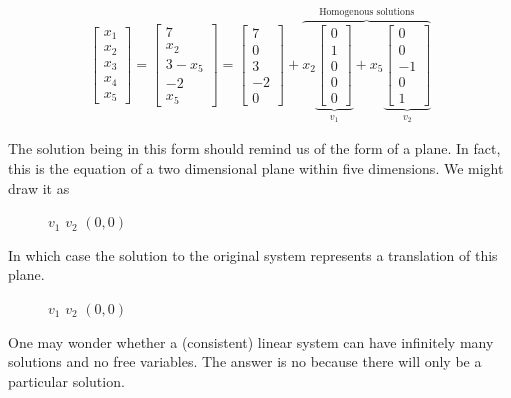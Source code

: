 \documentclass[11pt]{article}
\begin{document}
\begin{align*}
\begin{bmatrix}
x_1
\\
x_2
\\
x_3
\\
x_4
\\
x_5
\end{bmatrix}
=
\begin{bmatrix}7\\x_2\\3-x_5\\-2\\x_5\end{bmatrix}
=
\begin{bmatrix}7\\0\\3\\-2\\0\end{bmatrix}
+ \overbrace{
x_2
\underbrace{\begin{bmatrix}0\\1\\0\\0\\0\end{bmatrix}}_{v_1}
+ x_5
\underbrace{\begin{bmatrix}0\\0\\-1\\0\\1\end{bmatrix}}_{v_2}
}^{\text{Homogenous solutions}}
\end{align*}

The solution being in this form should remind us of the form of a plane. In fact, this is the equation of a two dimensional plane within five dimensions. We might draw it as

\begin{figure}[H]
\centering

$v_1$
$v_2$
$(0,0)$ 
\end{figure}

In which case the solution to the original system represents a translation of this plane.
\begin{figure}[H]

$v_1$
$v_2$
$(0,0)$
\end{figure}

One may wonder whether a (consistent) linear system can have infinitely many solutions and no free variables. The answer is no because there will only be a particular solution.
\end{document}
